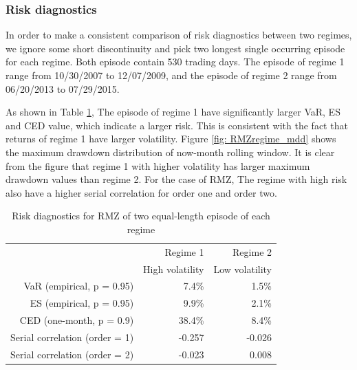 \documentclass[12pt]{article}
\begin{document}
\subsubsection{Risk diagnostics}

In order to make a consistent comparison of risk diagnostics between two regimes, we ignore some short discontinuity and pick two longest single occurring episode for each regime. Both episode contain 530 trading days. The episode of regime 1 range from 10/30/2007 to 12/07/2009, and the episode of regime 2 range from 06/20/2013 to 07/29/2015.

As shown in Table \ref{table:ridkDiagsRegimeRMZ}, The episode of regime 1 have significantly larger VaR, ES and CED value, which indicate a larger risk. This is consistent with the fact that returns of regime 1 have larger volatility. Figure \ref{fig: RMZregime_mdd} shows the maximum drawdown distribution of now-month rolling window. It is clear from the figure that regime 1 with higher volatility has larger maximum drawdown values than regime 2. For the case of RMZ, The regime with high risk also have a higher serial correlation for order one and order two. 

\begin{table}[!h]
\caption{Risk diagnostics for RMZ of two equal-length episode of each regime} 
\centering 
\begin{tabular}{| r | r | r |} 
 \hline
& Regime 1 & Regime 2 \\
& High volatility & Low volatility \\
 \hline 
VaR (empirical, p = 0.95) & 7.4\% & 1.5\% \\
ES (empirical, p = 0.95) & 9.9\% & 2.1\% \\
CED (one-month, p = 0.9) & 38.4\% & 8.4\% \\
Serial correlation (order = 1) & -0.257 & -0.026 \\
Serial correlation (order = 2) & -0.023 & 0.008 \\
 \hline
\end{tabular}
\label{table:ridkDiagsRegimeRMZ}
\end{table}
\end{document}
